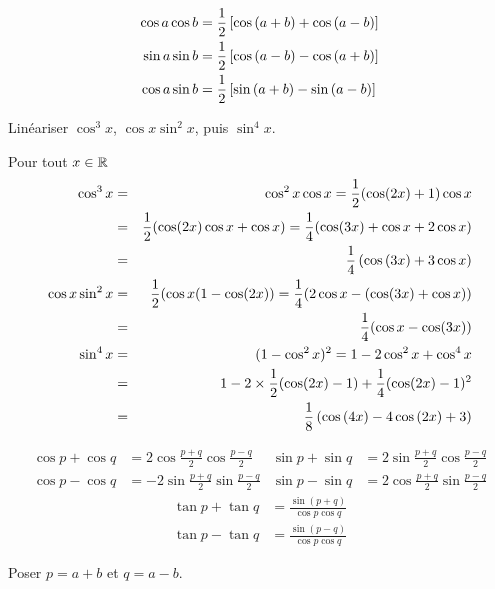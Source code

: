 \documentclass{magnoliaold}
\begin{document}
\begin{proposition}[utile=-3, nom={Linéarisation}]
\begin{align*}
\cos a\cos b&=\frac{1}{2}\left[\cos\left(a+b\right)+\cos\left(a-b\right)\right]\\
\sin a\sin b&=\frac{1}{2}\left[\cos\left(a-b\right)-\cos\left(a+b\right)\right]\\
\cos a\sin b&=\frac{1}{2}\left[\sin\left(a+b\right)-\sin\left(a-b\right)\right]
\end{align*}
\end{proposition}

\begin{exoUnique}
\exo Linéariser $\cos^3 x$, $\cos x\sin^2 x$, puis $\sin^4 x$.
  \begin{sol}
  Pour tout $x\in\mathbb{R}$
  \begin{eqnarray*}
  \cos^{3}x &=& \cos^{2}x \cos x = \frac{1}{2}(\cos (2x) +1)\cos x\\
            &=& \frac{1}{2}(\cos (2x)\cos x +\cos x)=\frac{1}{4}(\cos (3x)+\cos x +2\cos x)\\
            &=& \frac{1}{4}\left(\cos\left(3x\right)+3\cos x\right)\\
  \cos x\sin^2 x &=& \frac{1}{2}(\cos x(1-\cos (2x))=\frac{1}{4}(2\cos x -( \cos (3x)+\cos x))\\
                 &=& \frac{1}{4}(\cos x - \cos (3x))\\
  \sin^4 x &=& (1-\cos^{2}x)^{2}=1-2\cos^{2}x+\cos^{4}x\\
           &=& 1-2\times\frac{1}{2}(\cos (2x)-1)+\frac{1}{4}(\cos (2x)-1)^{2}\\
           &=& \frac{1}{8}\left(\cos\left(4x\right)-4\cos\left(2x\right)+3\right)
  \end{eqnarray*}
  \end{sol}
\end{exoUnique}

\begin{proposition}[utile=-3, nom={Factorisation}]
\begin{align*}
\cos p+\cos q&=2\cos\frac{p+q}{2}\cos\frac{p-q}{2} &
\sin p+\sin q&=2\sin\frac{p+q}{2}\cos\frac{p-q}{2}\\
\cos p-\cos q&=-2\sin\frac{p+q}{2}\sin\frac{p-q}{2} &
\sin p-\sin q&=2\cos\frac{p+q}{2}\sin\frac{p-q}{2}
\end{align*}
\begin{align*}
\tan p+\tan q&=\frac{\sin(p+q)}{\cos p\cos q}\\
\tan p-\tan q&=\frac{\sin(p-q)}{\cos p\cos q}
\end{align*}
\end{proposition}
\begin{preuve}
Poser $p=a+b$ et $q=a-b$.
\end{preuve}
\end{document}
